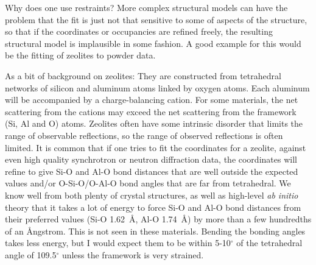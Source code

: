 Why does one use restraints? More complex structural models can have the problem that the fit is just not that sensitive to some of aspects of the structure, so that if the coordinates or occupancies are refined freely, the resulting structural model is implausible in some fashion. A good example for this would be the fitting of zeolites to powder data. 

As a bit of background on zeolites: They are constructed from tetrahedral networks of silicon and aluminum atoms linked by oxygen atoms. Each aluminum will be accompanied by a charge-balancing cation. For some materials, the net scattering from the cations may exceed the net scattering from the framework (Si, Al and O) atoms. Zeolites often have some intrinsic disorder that limits the range of observable reflections, so the range of observed reflections is often limited. It is common that if one tries to fit the coordinates for a zeolite, against even high quality synchrotron or neutron diffraction data, the coordinates will refine to give Si-O and Al-O bond distances that are well outside the expected values and/or O-Si-O/O-Al-O bond angles that are far from tetrahedral. We know well from both plenty of crystal structures, as well as high-level \textit{ab initio} theory that it takes a lot of energy to force Si-O and Al-O bond distances from their preferred values (Si-O 1.62~\AA, Al-O 1.74~\AA) by more than a few hundredths of an Ångstrom. This is not seen in these materials. Bending the bonding angles takes less energy, but I would expect them to be within 5-10$^\circ$ of the tetrahedral angle of 109.5$^\circ$ unless the framework is very strained. 

